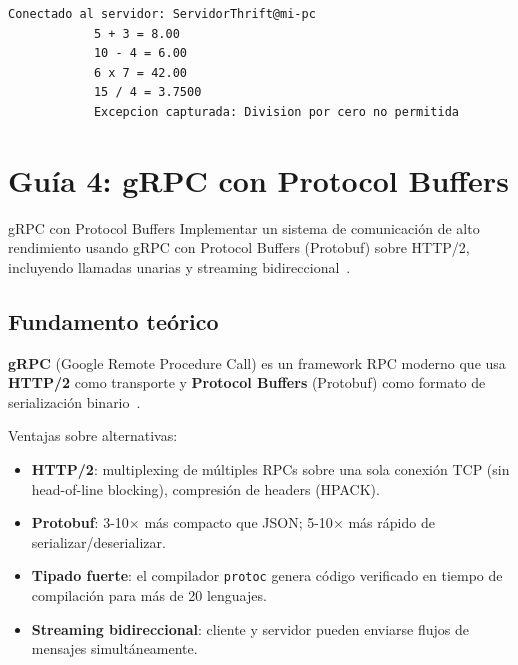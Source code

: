 \documentclass[12pt, a4paper, openany]{book}
\newcounter{paso}[section]
\newcommand{\resetpasos}{\setcounter{paso}{0}}
\newcommand{\code}[1]{\texttt{\small#1}}
\begin{document}
	\begin{resultadobox}
		\begin{lstlisting}[style=BashStyle]
			Conectado al servidor: ServidorThrift@mi-pc
			5 + 3 = 8.00
			10 - 4 = 6.00
			6 x 7 = 42.00
			15 / 4 = 3.7500
			Excepcion capturada: Division por cero no permitida
		\end{lstlisting}
	\end{resultadobox}
	
	\chapter{Guía 4: gRPC con Protocol Buffers}
	\resetpasos
	
	\begin{objetivobox}{gRPC con Protocol Buffers}
		Implementar un sistema de comunicación de alto rendimiento usando gRPC con
		Protocol Buffers (Protobuf) sobre HTTP/2, incluyendo llamadas unarias y
		streaming bidireccional~\parencite{indrasiri2020}.
	\end{objetivobox}
	
	\section{Fundamento teórico}
	
	\textbf{gRPC} (Google Remote Procedure Call) es un framework RPC moderno
	que usa \textbf{HTTP/2} como transporte y \textbf{Protocol Buffers} (Protobuf)
	como formato de serialización binario~\parencite{indrasiri2020}.
	
	Ventajas sobre alternativas:
	\begin{itemize}
		\item \textbf{HTTP/2}: multiplexing de múltiples RPCs sobre una sola conexión
		TCP (sin head-of-line blocking), compresión de headers (HPACK).
		\item \textbf{Protobuf}: 3-10$\times$ más compacto que JSON; 5-10$\times$ más
		rápido de serializar/deserializar.
		\item \textbf{Tipado fuerte}: el compilador \code{protoc} genera código
		verificado en tiempo de compilación para más de 20 lenguajes.
		\item \textbf{Streaming bidireccional}: cliente y servidor pueden enviarse
		flujos de mensajes simultáneamente.
	\end{itemize}
	
\end{document}
